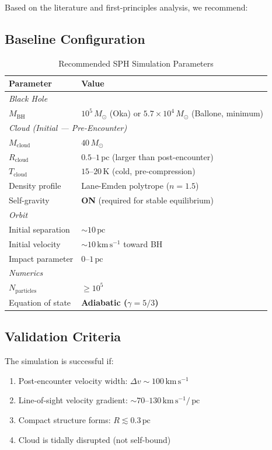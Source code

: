 \documentclass[11pt,a4paper]{article}
\newcommand{\Msun}{M_\odot}
\newcommand{\kms}{\,\mathrm{km\,s^{-1}}}
\newcommand{\pc}{\,\mathrm{pc}}
\begin{document}
Based on the literature and first-principles analysis, we recommend:

\subsection{Baseline Configuration}

\begin{table}[h]
\centering
\caption{Recommended SPH Simulation Parameters}
\begin{tabular}{ll}
\toprule
\textbf{Parameter} & \textbf{Value} \\
\midrule
\multicolumn{2}{l}{\textit{Black Hole}} \\
$M_\mathrm{BH}$ & $10^5\,\Msun$ (Oka) or $5.7 \times 10^4\,\Msun$ (Ballone, minimum) \\
\midrule
\multicolumn{2}{l}{\textit{Cloud (Initial --- Pre-Encounter)}} \\
$M_\mathrm{cloud}$ & $40\,\Msun$ \\
$R_\mathrm{cloud}$ & $0.5$--$1\pc$ (larger than post-encounter) \\
$T_\mathrm{cloud}$ & $15$--$20\,\mathrm{K}$ (cold, pre-compression) \\
Density profile & Lane-Emden polytrope ($n = 1.5$) \\
Self-gravity & \textbf{ON} (required for stable equilibrium) \\
\midrule
\multicolumn{2}{l}{\textit{Orbit}} \\
Initial separation & $\sim 10\pc$ \\
Initial velocity & $\sim 10\kms$ toward BH \\
Impact parameter & $0$--$1\pc$ \\
\midrule
\multicolumn{2}{l}{\textit{Numerics}} \\
$N_\mathrm{particles}$ & $\geq 10^5$ \\
Equation of state & \textbf{Adiabatic ($\gamma = 5/3$)} \\
\bottomrule
\end{tabular}
\end{table}

\subsection{Validation Criteria}

The simulation is successful if:
\begin{enumerate}
    \item Post-encounter velocity width: $\Delta v \sim 100\kms$
    \item Line-of-sight velocity gradient: $\sim 70$--$130\kms/\pc$
    \item Compact structure forms: $R \lesssim 0.3\pc$
    \item Cloud is tidally disrupted (not self-bound)
\end{enumerate}
\end{document}
